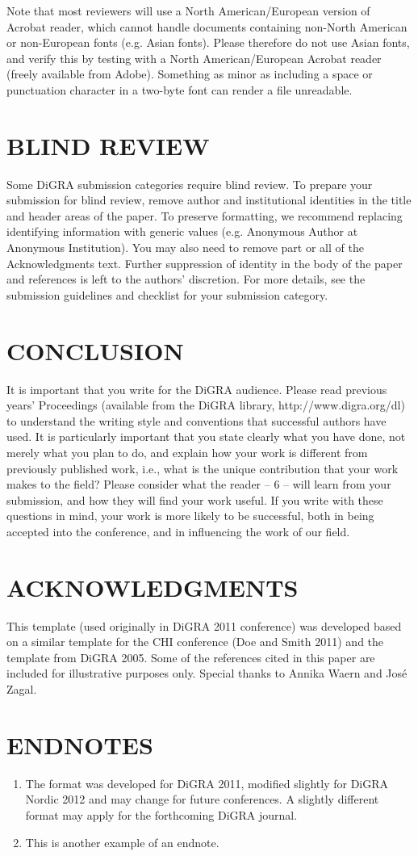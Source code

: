 \documentclass[11pt]{article}
\begin{document}
Note that most reviewers will use a North American/European version of Acrobat reader,
which cannot handle documents containing non-North American or non-European fonts
(e.g. Asian fonts). Please therefore do not use Asian fonts, and verify this by testing with
a North American/European Acrobat reader (freely available from Adobe). Something as
minor as including a space or punctuation character in a two-byte font can render a file
unreadable.
\section*{BLIND REVIEW}
Some DiGRA submission categories require blind review. To prepare your submission
for blind review, remove author and institutional identities in the title and header areas of
the paper. To preserve formatting, we recommend replacing identifying information with
generic values (e.g. Anonymous Author at Anonymous Institution). You may also need to
remove part or all of the Acknowledgments text. Further suppression of identity in the
body of the paper and references is left to the authors' discretion. For more details, see the
submission guidelines and checklist for your submission category.
\section*{CONCLUSION}
It is important that you write for the DiGRA audience. Please read previous years’
Proceedings (available from the DiGRA library, http://www.digra.org/dl) to understand
the writing style and conventions that successful authors have used. It is particularly
important that you state clearly what you have done, not merely what you plan to do, and
explain how your work is different from previously published work, i.e., what is the
unique contribution that your work makes to the field? Please consider what the reader 
-- 6 --
will learn from your submission, and how they will find your work useful. If you write
with these questions in mind, your work is more likely to be successful, both in being
accepted into the conference, and in influencing the work of our field.
\section*{ACKNOWLEDGMENTS}
This template (used originally in DiGRA 2011 conference) was developed based on a
similar template for the CHI conference (Doe and Smith 2011) and the template from
DiGRA 2005. Some of the references cited in this paper are included for illustrative
purposes only. Special thanks to Annika Waern and José Zagal.
\section*{ENDNOTES}
\begin{enumerate}
\item The format was developed for DiGRA 2011, modified slightly for DiGRA Nordic 2012
and may change for future conferences. A slightly different format may apply for the
forthcoming DiGRA journal.
\item This is another example of an endnote.
\end{enumerate}
\end{document}
